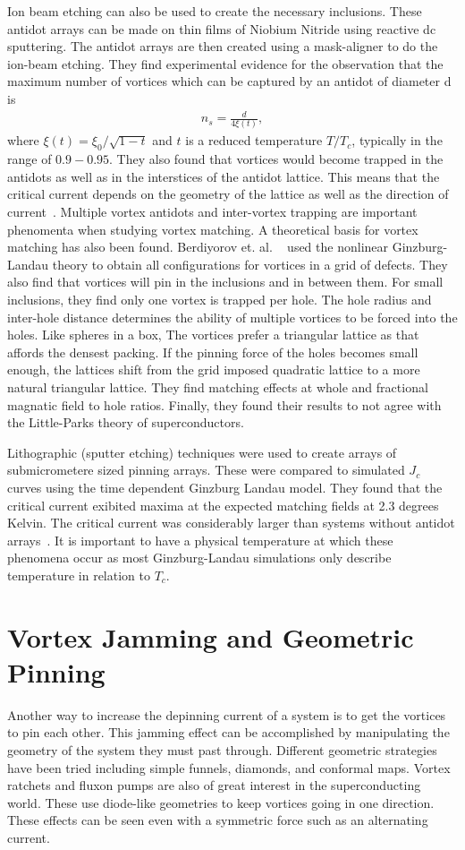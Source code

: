 Ion beam etching can also be used to create the necessary inclusions. These antidot arrays can be made on thin films of Niobium Nitride using reactive dc sputtering. The antidot arrays are then created using a mask-aligner to do the ion-beam etching. They find experimental evidence for the observation that the maximum number of vortices which can be captured by an antidot of diameter d is
\begin{eqnarray}
n_s = \frac {d} {4 \xi(t)}, 
\label{}
\end{eqnarray}
where $\xi(t) = \xi_0 / \sqrt{1-t}$ and $t$ is a reduced temperature $T/T_c$, typically in the range of $0.9 - 0.95$. They also found that vortices would become trapped in the antidots as well as in the interstices of the antidot lattice. This means that the critical current depends on the geometry of the lattice as well as the direction of current~\cite{Thakur09}. Multiple vortex antidots and inter-vortex trapping are important phenomenta when studying vortex matching. A theoretical basis for vortex matching has also been found. Berdiyorov et. al. ~\cite{Berdiyorov06} used the nonlinear Ginzburg-Landau theory to obtain all configurations for vortices in a grid of defects. They also find that vortices will pin in the inclusions and in between them. For small inclusions, they find only one vortex is trapped per hole. The hole radius and inter-hole distance determines the ability of multiple vortices to be forced into the holes. Like spheres in a box, The vortices prefer a triangular lattice as that affords the densest packing. If the pinning force of the holes becomes small enough, the lattices shift from the grid imposed quadratic lattice to a more natural triangular lattice. They find matching effects at whole and fractional magnatic field to hole ratios. Finally, they found their results to not agree with the Little-Parks theory of superconductors.

Lithographic (sputter etching) techniques were used to create arrays of submicrometere sized pinning arrays. These were compared to simulated $J_c$ curves using the time dependent Ginzburg Landau model. They found that the critical current exibited maxima at the expected matching fields at 2.3 degrees Kelvin. The critical current was considerably larger than systems without antidot arrays~\cite{Sabatino10}.
It is important to have a physical temperature at which these phenomena occur as most Ginzburg-Landau simulations only describe temperature in relation to $T_c$.

\section{Vortex Jamming and Geometric Pinning}
Another way to increase the depinning current of a system is to get the vortices to pin each other. This jamming effect can be accomplished by manipulating the geometry of the system they must past through. Different geometric strategies have been tried including simple funnels, diamonds, and conformal maps. Vortex ratchets and fluxon pumps are also of great interest in the superconducting world. These use diode-like geometries to keep vortices going in one direction. These effects can be seen even with a symmetric force such as an alternating current.  

